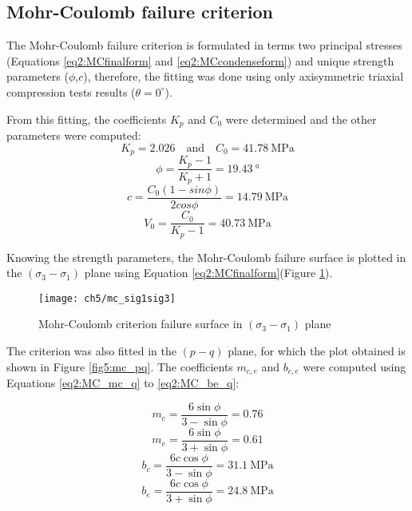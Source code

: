 \subsection{Mohr-Coulomb failure criterion}

The Mohr-Coulomb failure criterion is formulated in terms two principal stresses (Equations \ref{eq2:MCfinalform} and \ref{eq2:MCcondenseform}) and unique strength parameters ($\phi$,$c$), therefore, the fitting was done using only axisymmetric triaxial compression tests results ($\theta = 0^\circ$). 

From this fitting, the coefficients $K_p$ and $C_0$ were determined and the other parameters were computed: 
\begin{equation}
    K_p = 2.026 \quad \textrm{and} \quad C_0 = \SI{41.78}{\mega\pascal}
\end{equation}
\begin{equation}
    \phi = \frac{K_p-1}{K_p+1} = \SI{19.43}{\degree}
\end{equation}
\begin{equation}
    c = \frac{C_0(1-sin\phi)}{2cos\phi} = \SI{14.79}{\mega\pascal}
\end{equation}
\begin{equation}
    V_0 = \frac{C_0}{K_p-1} = \SI{40.73}{\mega\pascal}
\end{equation}

Knowing the strength parameters, the Mohr-Coulomb failure surface is plotted in the $(\sigma_3-\sigma_1)$ plane using Equation \ref{eq2:MCfinalform}(Figure \ref{fig5:mc_sig1sig3}).

\begin{figure}[p]
    \centering
    \texttt{[image: ch5/mc\_sig1sig3]}
    \caption{Mohr-Coulomb criterion failure surface in  $(\sigma_3-\sigma_1)$ plane}
    \label{fig5:mc_sig1sig3}
\end{figure} 

The criterion was also fitted in the $(p-q)$ plane, for which the plot obtained is shown in Figure \ref{fig5:mc_pq}. The coefficients $m_{c,e}$ and $b_{c,e}$ were computed using Equations \ref{eq2:MC_mc_q} to \ref{eq2:MC_be_q}:

\begin{equation}
    m_c = \frac{6 \sin \phi}{3-\sin \phi} = 0.76
\end{equation}
\begin{equation}
    m_e = \frac{6 \sin \phi}{3+\sin \phi} = 0.61
\end{equation}
\begin{equation}
    b_c = \frac{6 c \cos \phi}{3-\sin \phi} = \SI{31.1}{\mega\pascal}
\end{equation}
\begin{equation}
    b_e = \frac{6 c \cos \phi}{3+\sin \phi} = \SI{24.8}{\mega\pascal}
\end{equation}

